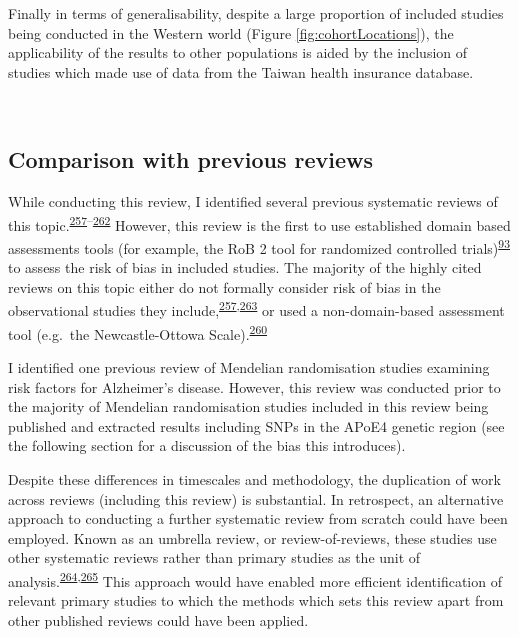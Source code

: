 \documentclass[a4paper, twoside]{templates/ociamthesis}
\begin{document}
Finally in terms of generalisability, despite a large proportion of included studies being conducted in the Western world (Figure \ref{fig:cohortLocations}), the applicability of the results to other populations is aided by the inclusion of studies which made use of data from the Taiwan health insurance database.

~

\hypertarget{rev-previous-reviews}{%
\subsection{Comparison with previous reviews}\label{rev-previous-reviews}}

While conducting this review, I identified several previous systematic reviews of this topic.\textsuperscript{\protect\hyperlink{ref-chu2018}{257}--\protect\hyperlink{ref-kuzma2018risk}{262}} However, this review is the first to use established domain based assessments tools (for example, the RoB 2 tool for randomized controlled trials)\textsuperscript{\protect\hyperlink{ref-sterne2019}{93}} to assess the risk of bias in included studies. The majority of the highly cited reviews on this topic either do not formally consider risk of bias in the observational studies they include,\textsuperscript{\protect\hyperlink{ref-chu2018}{257},\protect\hyperlink{ref-power2015}{263}} or used a non-domain-based assessment tool (e.g.~the Newcastle-Ottowa Scale).\textsuperscript{\protect\hyperlink{ref-poly2020}{260}}

I identified one previous review of Mendelian randomisation studies examining risk factors for Alzheimer's disease. However, this review was conducted prior to the majority of Mendelian randomisation studies included in this review being published and extracted results including SNPs in the APoE4 genetic region (see the following section for a discussion of the bias this introduces).

Despite these differences in timescales and methodology, the duplication of work across reviews (including this review) is substantial. In retrospect, an alternative approach to conducting a further systematic review from scratch could have been employed. Known as an umbrella review, or review-of-reviews, these studies use other systematic reviews rather than primary studies as the unit of analysis.\textsuperscript{\protect\hyperlink{ref-aromataris2015}{264},\protect\hyperlink{ref-smith2011}{265}} This approach would have enabled more efficient identification of relevant primary studies to which the methods which sets this review apart from other published reviews could have been applied.
\end{document}
